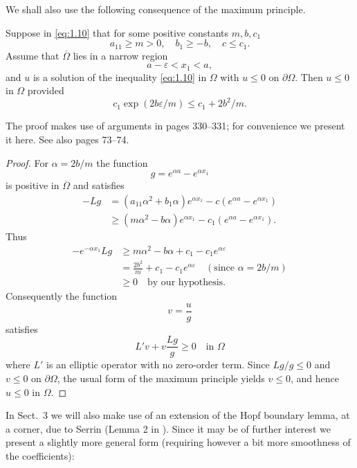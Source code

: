 We shall also use the following consequence of the maximum principle.

\begin{corollary*}
  Suppose in \eqref{eq:1.10} that for some positive constants $m,b,c_1$
  \[a_{11}\geq m>0,\quad b_1\geq -b,\quad c\leq c_1.\]
  Assume that $\overline{\Omega}$ lies in a narrow region
  \[a-\varepsilon < x_1 < a,\]
  and $u$ is a solution of the inequality \eqref{eq:1.10} in $\Omega$
  with $u\leq 0$ on $\partial\Omega$. Then $u\leq 0$ in $\Omega$ provided
  \[c_1\exp(2b\varepsilon/m) \leq c_1 + 2b^2/m.\]
\end{corollary*}

The proof makes use of arguments in \cite{courant_methods_1989} pages 330--331;
for convenience we present it here. See also \cite{protter_maximum_1984} pages 73--74.

\begin{proof}
  For $\alpha = 2b/m$ the function
  \[g = e^{\alpha a} - e^{\alpha x_1}\]
  is positive in $\overline{\Omega}$ and satisfies
  \begin{align*}
    -Lg
    & = (a_{11}\alpha^2 + b_1\alpha)e^{\alpha x_1} -c(e^{\alpha a}-e^{\alpha x_1}) \\
    & \geq (m\alpha^2-b\alpha)e^{\alpha x_1} - c_1(e^{\alpha a}-e^{\alpha x_1}).
  \end{align*}
  Thus
  \begin{align*}
    -e^{-\alpha x_1} Lg
    & \geq m\alpha^2 - b\alpha + c_1 - c_1 e^{\alpha\varepsilon} \\
    & = \frac{2b^2}{m} + c_1 - c_1 e^{\alpha\varepsilon}\quad (\text{since } \alpha=2b/m) \\
    & \geq 0\quad \text{by our hypothesis}.
  \end{align*}
  Consequently the function
  \[v = \frac{u}{g}\]
  satisfies
  \[L'v + v\frac{Lg}{g} \geq 0\quad\text{in } \Omega\]
  where $L'$ is an elliptic operator with no zero-order term.
  Since $Lg/g\leq 0$ and $v\leq 0$ on $\partial\Omega$,
  the usual form of the maximum principle yields $v\leq 0$,
  and hence $u\leq 0$ in $\Omega$.
\end{proof}

  
In Sect.~3 we will also make use of an extension of the Hopf boundary lemma,
at a corner, due to Serrin (Lemma 2 in \cite{serrin_symmetry_1971}). Since it may be of further interest
we present a slightly more general form (requiring however a bit more smoothness of
the coefficients):

